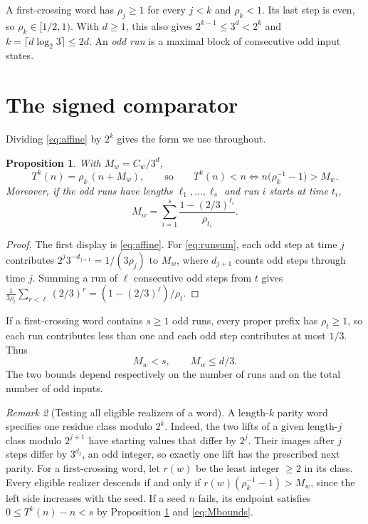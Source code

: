 \documentclass[11pt,a4paper]{article}
\theoremstyle{plain}\newtheorem{theorem}{Theorem}\newtheorem{proposition}[theorem]{Proposition}
\theoremstyle{definition}\newtheorem{example}[theorem]{Example}
\theoremstyle{remark}\newtheorem{remark}[theorem]{Remark}
\begin{document}
A first-crossing word has $\rho_j\ge1$ for every $j<k$ and $\rho_k<1$. Its last step is
even, so $\rho_k\in[1/2,1)$. With $d\ge1$, this also gives
$2^{k-1}\le 3^d<2^k$ and $k=\lceil d\log_2 3\rceil\le2d$.
An \emph{odd run} is a maximal block of consecutive odd input states.

\section{The signed comparator}\label{sec:comparator}
Dividing \eqref{eq:affine} by $2^k$ gives the form we use throughout.
\begin{proposition}\label{prop:comparator}
With $M_w=C_w/3^d$,
\[
T^k(n)=\rho_k\,(n+M_w),\qquad\text{so}\qquad T^k(n)<n\iff n\bigl(\rho_k^{-1}-1\bigr)>M_w .
\]
Moreover, if the odd runs have lengths $\ell_1,\dots,\ell_s$ and run $i$ starts at time $t_i$,
\begin{equation}\label{eq:runsum}
M_w=\sum_{i=1}^{s}\frac{1-(2/3)^{\ell_i}}{\rho_{t_i}} .
\end{equation}
\end{proposition}
\begin{proof}
The first display is \eqref{eq:affine}. For \eqref{eq:runsum}, each odd step at time $j$
contributes $2^j3^{-d_{j+1}}=1/(3\rho_j)$ to $M_w$, where $d_{j+1}$ counts odd steps through time
$j$. Summing a run of $\ell$ consecutive odd steps from $t$ gives
$\frac1{3\rho_t}\sum_{r<\ell}(2/3)^r=(1-(2/3)^\ell)/\rho_t$.
\end{proof}
If a first-crossing word contains $s\ge1$ odd runs, every proper prefix has $\rho_t\ge1$,
so each run contributes less than one and each odd step contributes at most $1/3$. Thus
\begin{equation}\label{eq:Mbounds}
M_w<s,\qquad M_w\le d/3 .
\end{equation}
The two bounds depend respectively on the number of runs and on the total number of odd inputs.

\begin{remark}[Testing all eligible realizers of a word]
A length-$k$ parity word specifies one residue class modulo $2^k$.
Indeed, the two lifts of a given length-$j$ class modulo $2^{j+1}$ have starting values that
differ by $2^j$. Their images after $j$ steps differ by $3^{d_j}$, an odd integer, so exactly
one lift has the prescribed next parity. For a first-crossing word, let $r(w)$ be the least
integer $\ge2$ in its class. Every eligible realizer descends if and only if
$r(w)(\rho_k^{-1}-1)>M_w$, since the left side increases with the seed.
If a seed $n$ fails, its endpoint satisfies $0\le T^k(n)-n<s$ by
Proposition \ref{prop:comparator} and \eqref{eq:Mbounds}.
\end{remark}
\end{document}
